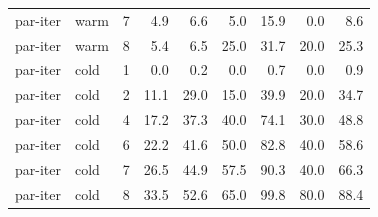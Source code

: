 {\begin{longtable}{lllrrrrrr}
par-iter & warm & 7 & 4.9 & 6.6 & 5.0 & 15.9 & 0.0 & 8.6 \\
par-iter & warm & 8 & 5.4 & 6.5 & 25.0 & 31.7 & 20.0 & 25.3 \\
\midrule
par-iter & cold & 1 & 0.0 & 0.2 & 0.0 & 0.7 & 0.0 & 0.9 \\
par-iter & cold & 2 & 11.1 & 29.0 & 15.0 & 39.9 & 20.0 & 34.7 \\
par-iter & cold & 4 & 17.2 & 37.3 & 40.0 & 74.1 & 30.0 & 48.8 \\
par-iter & cold & 6 & 22.2 & 41.6 & 50.0 & 82.8 & 40.0 & 58.6 \\
par-iter & cold & 7 & 26.5 & 44.9 & 57.5 & 90.3 & 40.0 & 66.3 \\
par-iter & cold & 8 & 33.5 & 52.6 & 65.0 & 99.8 & 80.0 & 88.4 \\
\end{longtable}
}
